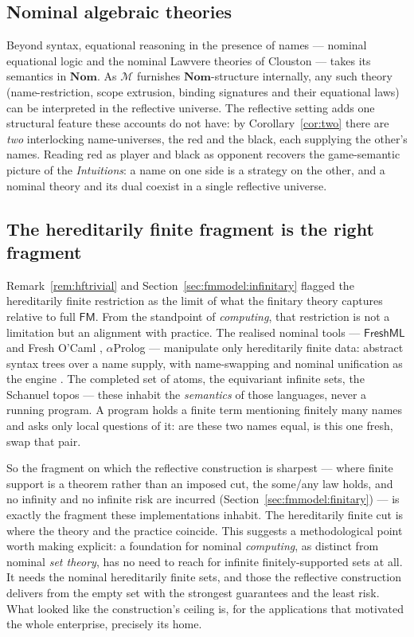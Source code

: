 \subsection{Nominal algebraic theories}
\label{sec:applications:alg}

Beyond syntax, equational reasoning in the presence of names --- nominal
equational logic and the nominal Lawvere theories of Clouston
\cite{DBLP:journals/jcss/Clouston14} --- takes its semantics in $\mathbf{Nom}$.
As $\mathcal{M}$ furnishes $\mathbf{Nom}$-structure internally, any such theory
(name-restriction, scope extrusion, binding signatures and their equational
laws) can be interpreted in the reflective universe. The reflective setting adds
one structural feature these accounts do not have: by
Corollary~\ref{cor:two} there are \emph{two} interlocking name-universes, the red
and the black, each supplying the other's names. Reading red as player and black
as opponent recovers the game-semantic picture of the \emph{Intuitions}: a name
on one side is a strategy on the other, and a nominal theory and its dual coexist
in a single reflective universe.

\subsection{The hereditarily finite fragment is the right fragment}
\label{sec:applications:hf}

Remark~\ref{rem:hftrivial} and Section~\ref{sec:fmmodel:infinitary} flagged the
hereditarily finite restriction as the limit of what the finitary theory captures
relative to full $\mathsf{FM}$. From the standpoint of \emph{computing}, that
restriction is not a limitation but an alignment with practice. The realised
nominal tools --- $\mathsf{FreshML}$ and Fresh O'Caml
\cite{shinwell2003freshml,shinwell2005freshocaml}, $\alpha$Prolog
\cite{cheney2004alphaprolog} --- manipulate only hereditarily finite data:
abstract syntax trees over a name supply, with name-swapping and nominal
unification as the engine \cite{pitts2013nominal}. The completed set of atoms, the
equivariant infinite sets, the Schanuel topos --- these inhabit the
\emph{semantics} of those languages, never a running program. A program holds a
finite term mentioning finitely many names and asks only local questions of it:
are these two names equal, is this one fresh, swap that pair.

So the fragment on which the reflective construction is sharpest --- where finite
support is a theorem rather than an imposed cut, the some/any law holds, and no
infinity and no infinite risk are incurred (Section~\ref{sec:fmmodel:finitary})
--- is exactly the fragment these implementations inhabit. The hereditarily finite
cut is where the theory and the practice coincide. This suggests a methodological
point worth making explicit: a foundation for nominal \emph{computing}, as
distinct from nominal \emph{set theory}, has no need to reach for infinite
finitely-supported sets at all. It needs the nominal hereditarily finite sets,
and those the reflective construction delivers from the empty set with the
strongest guarantees and the least risk. What looked like the construction's
ceiling is, for the applications that motivated the whole enterprise, precisely
its home.


